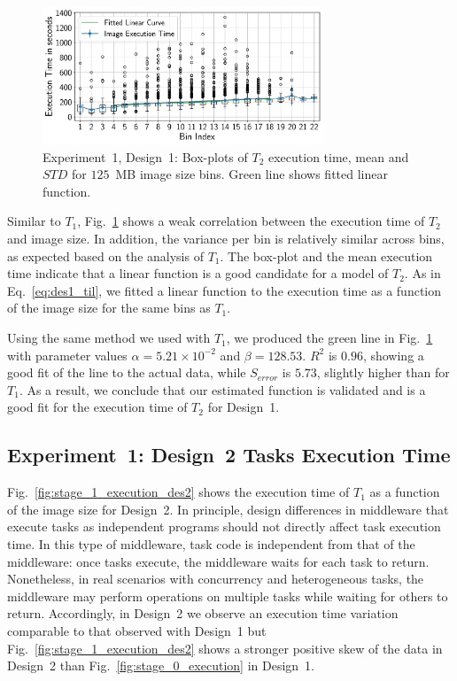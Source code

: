 \begin{figure}[t]
    \centering
    \includegraphics[width=0.75\textwidth]{figures/designs/stage_1_tx_box.pdf}
    \caption{Experiment~1, Design~1: Box-plots of $T_{2}$ execution time, mean and $STD$ for $125$~MB image size bins.
        Green line shows fitted linear function.}
    \label{fig:stage_1_execution}
\end{figure}

Similar to $T_{1}$, Fig.~\ref{fig:stage_1_execution} shows a weak correlation between the execution time of $T_{2}$ and image size.
In addition, the variance per bin is relatively similar across bins, as expected based on the analysis of $T_{1}$.
The box-plot and the mean execution time indicate that a linear function is a good candidate for a model of $T_{2}$.
As in Eq.~\ref{eq:des1_til}, we fitted a linear function to the execution time as a function of the image size for the same bins as $T_{1}$.

Using the same method we used with $T_{1}$, we produced the green line in Fig.~\ref{fig:stage_1_execution} with parameter values $\alpha = 5.21 \times 10^{-2}$ and $\beta = 128.53$.
$R^{2}$ is $0.96$, showing a good fit of the line to the actual data, while $S_{error}$ is $5.73$, slightly higher than for $T_{1}$.
As a result, we conclude that our estimated function is validated and is a good fit for the execution time of $T_{2}$ for Design~1.

\subsection{Experiment~1: Design~2 Tasks Execution Time}

Fig.~\ref{fig:stage_1_execution_des2} shows the execution time of $T_{1}$ as a function of the image size for Design~2.
In principle, design differences in middleware that execute tasks as independent programs should not directly affect task execution time.
In this type of middleware, task code is independent from that of the middleware: once tasks execute, the middleware waits for each task to return.
Nonetheless, in real scenarios with concurrency and heterogeneous tasks, the middleware may perform operations on multiple tasks while waiting for others to return.
Accordingly, in Design~2 we observe an execution time variation comparable to that observed with Design~1 but Fig.~\ref{fig:stage_1_execution_des2} shows a stronger positive skew of the data in Design~2 than Fig.~\ref{fig:stage_0_execution} in Design~1.

